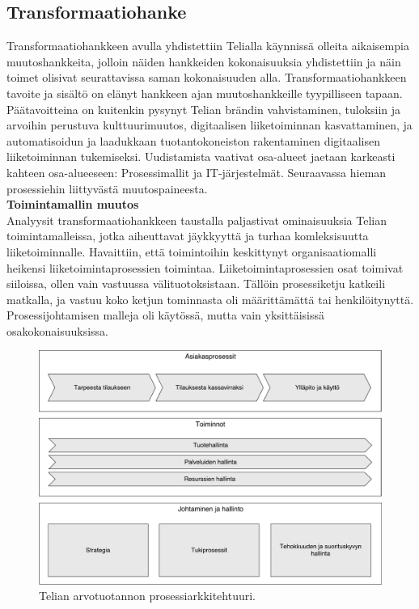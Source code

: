 \documentclass[finnish,12pt,a4paper,pdftex]{article}
\begin{document}
\subsection{Transformaatiohanke}

Transformaatiohankkeen avulla yhdistettiin Telialla käynnissä olleita aikaisempia muutoshankkeita, jolloin näiden hankkeiden kokonaisuuksia yhdistettiin ja näin toimet olisivat seurattavissa saman kokonaisuuden alla. Transformaatiohankkeen tavoite ja sisältö on elänyt hankkeen ajan muutoshankkeille tyypilliseen tapaan. Päätavoitteina on kuitenkin pysynyt Telian brändin vahvistaminen, tuloksiin ja arvoihin perustuva kulttuurimuutos, digitaalisen liiketoiminnan kasvattaminen, ja automatisoidun ja laadukkaan tuotantokoneiston rakentaminen digitaalisen liiketoiminnan tukemiseksi. Uudistamista vaativat osa-alueet jaetaan karkeasti kahteen osa-alueeseen: Prosessimallit ja IT-järjestelmät. Seuraavassa hieman prosessiehin liittyvästä muutospaineesta.\\

\textbf{Toimintamallin muutos}\\

Analyysit transformaatiohankkeen taustalla paljastivat ominaisuuksia Telian toimintamalleissa, jotka aiheuttavat jäykkyyttä ja turhaa komleksisuutta liiketoiminnalle. Havaittiin, että toimintoihin keskittynyt organisaatiomalli heikensi liiketoimintaprosessien toimintaa. Liiketoimintaprosessien osat toimivat siiloissa, ollen vain vastuussa välituotoksistaan. Tällöin prosessiketju katkeili matkalla, ja vastuu koko ketjun tominnasta oli määrittämättä tai henkilöitynyttä. Prosessijohtamisen malleja oli käytössä, mutta vain yksittäisissä osakokonaisuuksissa.\\


\begin{figure}[!h]
    \centering
    \includegraphics[scale=0.4]{images/prosessiarkkitehtuuri.pdf}
    \caption{Telian arvotuotannon prosessiarkkitehtuuri.}
    \label{fig:prosark}
\end{figure}
\end{document}

